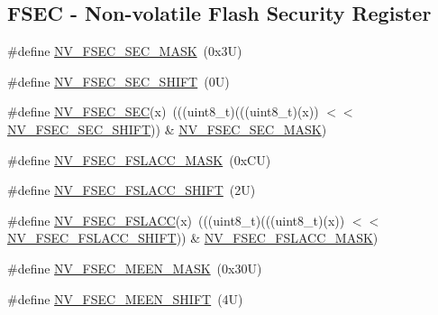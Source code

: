 \subsection*{F\+S\+EC -\/ Non-\/volatile Flash Security Register}
\begin{DoxyCompactItemize}
\item 
\#define \mbox{\hyperlink{group___n_v___register___masks_gab159c721c6cde1f629b630c573da8ea9}{N\+V\+\_\+\+F\+S\+E\+C\+\_\+\+S\+E\+C\+\_\+\+M\+A\+SK}}~(0x3\+U)
\item 
\#define \mbox{\hyperlink{group___n_v___register___masks_ga92a819b24b0472a83857ddd2d950ab08}{N\+V\+\_\+\+F\+S\+E\+C\+\_\+\+S\+E\+C\+\_\+\+S\+H\+I\+FT}}~(0\+U)
\item 
\#define \mbox{\hyperlink{group___n_v___register___masks_ga285ae0f5ea99f97dfae69dc7affebcde}{N\+V\+\_\+\+F\+S\+E\+C\+\_\+\+S\+EC}}(x)~(((uint8\+\_\+t)(((uint8\+\_\+t)(x)) $<$$<$ \mbox{\hyperlink{group___n_v___register___masks_ga92a819b24b0472a83857ddd2d950ab08}{N\+V\+\_\+\+F\+S\+E\+C\+\_\+\+S\+E\+C\+\_\+\+S\+H\+I\+FT}})) \& \mbox{\hyperlink{group___n_v___register___masks_gab159c721c6cde1f629b630c573da8ea9}{N\+V\+\_\+\+F\+S\+E\+C\+\_\+\+S\+E\+C\+\_\+\+M\+A\+SK}})
\item 
\#define \mbox{\hyperlink{group___n_v___register___masks_ga8fd3b6696c82aa96017fe25be34d19c9}{N\+V\+\_\+\+F\+S\+E\+C\+\_\+\+F\+S\+L\+A\+C\+C\+\_\+\+M\+A\+SK}}~(0x\+C\+U)
\item 
\#define \mbox{\hyperlink{group___n_v___register___masks_gaba549ee99b8ca1af3531eafd5746f6b6}{N\+V\+\_\+\+F\+S\+E\+C\+\_\+\+F\+S\+L\+A\+C\+C\+\_\+\+S\+H\+I\+FT}}~(2\+U)
\item 
\#define \mbox{\hyperlink{group___n_v___register___masks_ga75d524350a710ba87a95c927466a42d2}{N\+V\+\_\+\+F\+S\+E\+C\+\_\+\+F\+S\+L\+A\+CC}}(x)~(((uint8\+\_\+t)(((uint8\+\_\+t)(x)) $<$$<$ \mbox{\hyperlink{group___n_v___register___masks_gaba549ee99b8ca1af3531eafd5746f6b6}{N\+V\+\_\+\+F\+S\+E\+C\+\_\+\+F\+S\+L\+A\+C\+C\+\_\+\+S\+H\+I\+FT}})) \& \mbox{\hyperlink{group___n_v___register___masks_ga8fd3b6696c82aa96017fe25be34d19c9}{N\+V\+\_\+\+F\+S\+E\+C\+\_\+\+F\+S\+L\+A\+C\+C\+\_\+\+M\+A\+SK}})
\item 
\#define \mbox{\hyperlink{group___n_v___register___masks_ga02f5aa86e1f5bceefd0378fa736d5656}{N\+V\+\_\+\+F\+S\+E\+C\+\_\+\+M\+E\+E\+N\+\_\+\+M\+A\+SK}}~(0x30\+U)
\item 
\#define \mbox{\hyperlink{group___n_v___register___masks_ga13adfbdf46af9e59b446d17ce90b49c1}{N\+V\+\_\+\+F\+S\+E\+C\+\_\+\+M\+E\+E\+N\+\_\+\+S\+H\+I\+FT}}~(4\+U)

\end{DoxyCompactItemize}

